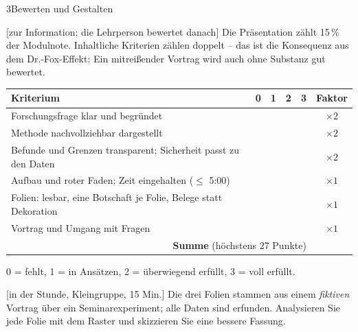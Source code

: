 \begin{uebungsblattb}{3}{Bewerten und Gestalten}

[zur Information; die Lehrperson bewertet danach]
Die Präsentation zählt 15\,\% der Modulnote. Inhaltliche Kriterien zählen
doppelt -- das ist die Konsequenz aus dem Dr.-Fox-Effekt: Ein mitreißender
Vortrag wird auch ohne Substanz gut bewertet.

\begin{center}\small
\renewcommand{\arraystretch}{1.5}
\begin{tabular}{|p{}|c|c|c|c|c|}
\hline
\textbf{Kriterium} & \textbf{0} & \textbf{1} & \textbf{2} & \textbf{3} & \textbf{Faktor} \\
\hline
Forschungsfrage klar und begründet & & & & & $\times 2$ \\ \hline
Methode nachvollziehbar dargestellt & & & & & $\times 2$ \\ \hline
Befunde und Grenzen transparent; Sicherheit passt zu den Daten & & & & & $\times 2$ \\ \hline
Aufbau und roter Faden; Zeit eingehalten ($\leq$ 5:00) & & & & & $\times 1$ \\ \hline
Folien: lesbar, eine Botschaft je Folie, Belege statt Dekoration & & & & & $\times 1$ \\ \hline
Vortrag und Umgang mit Fragen & & & & & $\times 1$ \\ \hline
\multicolumn{5}{|r|}{\textbf{Summe} (höchstens 27 Punkte)} & \\ \hline
\end{tabular}
\end{center}
{\small 0 = fehlt, 1 = in Ansätzen, 2 = überwiegend erfüllt, 3 = voll erfüllt.}

[in der Stunde, Kleingruppe, 15 Min.]
Die drei Folien stammen aus einem \emph{fiktiven} Vortrag über ein
Seminarexperiment; alle Daten sind erfunden. Analysieren Sie jede Folie
mit dem Raster und skizzieren Sie eine bessere Fassung.


\end{uebungsblattb}

